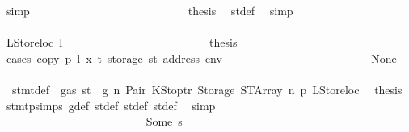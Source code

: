 \begin{isabellebody}
\ simp\isanewline
\ \ \ \ \ \ \ \ \ \ \ \ \ \ \ \ \ \ \ \ \ \ \ \ \isamarkupfalse%
\ \isamarkupfalse%
\ {\isacharquery}{\kern0pt}thesis\ \isamarkupfalse%
\ st{\isacharprime}{\kern0pt}{\isacharunderscore}{\kern0pt}def\ \isamarkupfalse%
\ simp\isanewline
\ \ \ \ \ \ \ \ \ \ \ \ \ \ \ \ \ \ \ \ \ \ \isamarkupfalse%
\isanewline
\ \ \ \ \ \ \ \ \ \ \ \ \ \ \ \ \ \ \ \ \isamarkupfalse%
\isanewline
\ \ \ \ \ \ \ \ \ \ \ \ \ \ \ \ \ \ \ \ \ \ \isamarkupfalse%
\ {\isacharparenleft}{\kern0pt}LStoreloc\ l{\isacharparenright}{\kern0pt}\isanewline
\ \ \ \ \ \ \ \ \ \ \ \ \ \ \ \ \ \ \ \ \ \ \isamarkupfalse%
\ \isamarkupfalse%
\ {\isacharquery}{\kern0pt}thesis\isanewline
\ \ \ \ \ \ \ \ \ \ \ \ \ \ \ \ \ \ \ \ \ \ \isamarkupfalse%
\ {\isacharparenleft}{\kern0pt}cases\ {\isachardoublequoteopen}copy\ p\ l\ x\ t\ {\isacharparenleft}{\kern0pt}storage\ st{\isacharprime}{\kern0pt}{\isacharprime}{\kern0pt}\ {\isacharparenleft}{\kern0pt}address\ env{\isacharparenright}{\kern0pt}{\isacharparenright}{\kern0pt}{\isachardoublequoteclose}{\isacharparenright}{\kern0pt}\isanewline
\ \ \ \ \ \ \ \ \ \ \ \ \ \ \ \ \ \ \ \ \ \ \ \ \isamarkupfalse%
\ None\isanewline
\ \ \ \ \ \ \ \ \ \ \ \ \ \ \ \ \ \ \ \ \ \ \ \ \isamarkupfalse%
\ {}{\isacharparenleft}{\kern0pt}{}{\isacharparenright}{\kern0pt}\ stmt{\isacharunderscore}{\kern0pt}def\ {\isacharbackquoteopen}{\isasymnot}\ gas\ st\ {\isasymle}\ g{\isacharbackquoteclose}\ n\ Pair\ KStoptr\ Storage\ STArray\ n{}\ p{}\ LStoreloc\ \isamarkupfalse%
\ {\isacharquery}{\kern0pt}thesis\ \isamarkupfalse%
\ stmt{\isachardot}{\kern0pt}psimps{\isacharparenleft}{\kern0pt}{}{\isacharparenright}{\kern0pt}\ g{\isacharunderscore}{\kern0pt}def\ st{\isacharprime}{\kern0pt}{\isacharunderscore}{\kern0pt}def\ st{\isacharprime}{\kern0pt}{\isacharprime}{\kern0pt}{\isacharunderscore}{\kern0pt}def\ st{\isacharprime}{\kern0pt}{\isacharprime}{\kern0pt}{\isacharprime}{\kern0pt}{\isacharunderscore}{\kern0pt}def\ \isamarkupfalse%
\ simp\isanewline
\ \ \ \ \ \ \ \ \ \ \ \ \ \ \ \ \ \ \ \ \ \ \isamarkupfalse%
\isanewline
\ \ \ \ \ \ \ \ \ \ \ \ \ \ \ \ \ \ \ \ \ \ \ \ \isamarkupfalse%
\ {\isacharparenleft}{\kern0pt}Some\ s{\isacharparenright}{\kern0pt}\isanewline
\ \ \ \ \ \ \ \ \ \ \ \ \ \ \ \ \ \ \ \ \ \ \ \ \isamarkupfalse%

\end{isabellebody}

